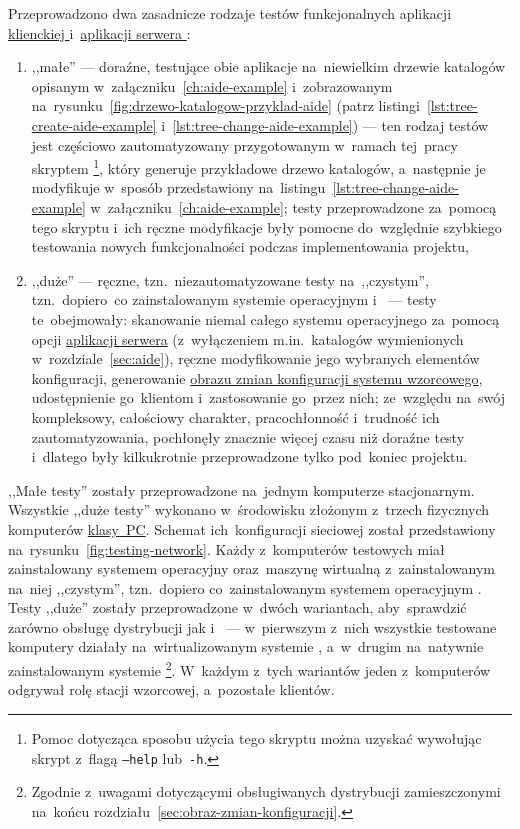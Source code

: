\documentclass[thesis]{subfiles}
\begin{document}
Przeprowadzono dwa zasadnicze rodzaje testów funkcjonalnych aplikacji \hyperref[sec:cli-app]{klienckiej \texttt{\cliappname{}}} i~\hyperref[sec:srv-app]{aplikacji serwera \texttt{\srvappname{}}}:\mynobreakpar
\begin{enumerate}
	\item ,,małe'' --- doraźne, testujące obie aplikacje na~niewielkim drzewie katalogów opisanym w~załączniku~\ref{ch:aide-example} i~zobrazowanym na~rysunku~\ref{fig:drzewo-katalogow-przyklad-aide} (patrz listingi~\ref{lst:tree-create-aide-example} i~\ref{lst:tree-change-aide-example}) --- ten rodzaj testów jest częściowo zautomatyzowany przygotowanym w~ramach tej~pracy skryptem \footnote{Pomoc dotycząca sposobu użycia tego skryptu można uzyskać wywołując skrypt z~flagą \texttt{--help} lub~\texttt{-h}.}, który generuje przykładowe drzewo katalogów, a~następnie je modyfikuje w~sposób przedstawiony na~listingu~\ref{lst:tree-change-aide-example} w~załączniku~\ref{ch:aide-example}; testy przeprowadzone za~pomocą tego skryptu i~ich ręczne modyfikacje były pomocne do~względnie szybkiego testowania nowych funkcjonalności podczas implementowania projektu,
	\item ,,duże'' --- ręczne, tzn.~niezautomatyzowane testy na~,,czystym'', tzn.~dopiero~co zainstalowanym systemie operacyjnym \linuxarch{} i~\debian{} --- testy te~obejmowały: skanowanie niemal całego systemu operacyjnego za~pomocą opcji  \hyperref[sec:srv-app]{aplikacji serwera} (z~wyłączeniem m.in.~katalogów wymienionych w~rozdziale~\ref{sec:aide}), ręczne modyfikowanie jego wybranych elementów konfiguracji, generowanie \hyperref[sec:obraz-zmian-konfiguracji]{obrazu zmian konfiguracji systemu wzorcowego}, udostępnienie go~klientom i~zastosowanie go~przez nich; ze~względu na~swój kompleksowy, całościowy charakter, pracochłonność i~trudność ich zautomatyzowania, pochłonęły znacznie więcej czasu niż doraźne testy i~dlatego były kilkukrotnie przeprowadzone tylko pod~koniec projektu.
\end{enumerate}

,,Małe testy'' zostały przeprowadzone na~jednym komputerze stacjonarnym. Wszystkie ,,duże testy'' wykonano w~środowisku złożonym z~trzech fizycznych komputerów \href{https://en.wikipedia.org/wiki/Personal_computer}{klasy~PC}. Schemat ich~konfiguracji sieciowej został przedstawiony na~rysunku~\ref{fig:testing-network}. Każdy z~komputerów testowych miał zainstalowany systemem operacyjny \debian{} oraz~maszynę wirtualną  z~zainstalowanym na~niej ,,czystym'', tzn.~dopiero co~zainstalowanym systemem operacyjnym \linuxarch{}. Testy ,,duże'' zostały przeprowadzone w~dwóch wariantach, aby~sprawdzić zarówno obsługę dystrybucji \linuxarch{} jak i~\debian{} --- w~pierwszym z~nich wszystkie testowane komputery działały na~wirtualizowanym systemie \linuxarch{}, a~w~drugim na~natywnie zainstalowanym systemie \debian{}\footnote{Zgodnie z~uwagami dotyczącymi obsługiwanych dystrybucji  zamieszczonymi na~końcu rozdziału~\ref{sec:obraz-zmian-konfiguracji}.}. W~każdym z~tych wariantów jeden z~komputerów odgrywał rolę stacji wzorcowej, a~pozostałe klientów.
\end{document}
